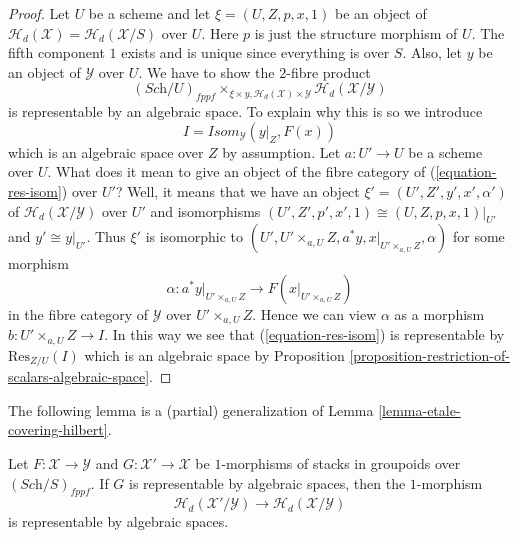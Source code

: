 \begin{proof}
Let $U$ be a scheme and let $\xi = (U, Z, p, x, 1)$ be an object of
$\mathcal{H}_d(\mathcal{X}) = \mathcal{H}_d(\mathcal{X}/S)$ over $U$.
Here $p$ is just the structure morphism of $U$.
The fifth component $1$ exists and is unique
since everything is over $S$.
Also, let $y$ be an object of $\mathcal{Y}$ over $U$.
We have to show the $2$-fibre product
\begin{equation}
\label{equation-res-isom}
(\textit{Sch}/U)_{fppf}
\times_{\xi \times y, \mathcal{H}_d(\mathcal{X}) \times \mathcal{Y}}
\mathcal{H}_d(\mathcal{X}/\mathcal{Y})
\end{equation}
is representable by an algebraic space. To explain why this is so
we introduce
$$
I = \mathit{Isom}_{\mathcal{Y}}(y|_Z, F(x))
$$
which is an algebraic space over $Z$ by assumption. Let $a : U' \to U$
be a scheme over $U$. What does it mean to give an object of the fibre
category of (\ref{equation-res-isom}) over $U'$? Well, it means that we
have an object $\xi' = (U', Z', y', x', \alpha')$ of
$\mathcal{H}_d(\mathcal{X}/\mathcal{Y})$ over $U'$ and isomorphisms
$(U', Z', p', x', 1) \cong (U, Z, p, x, 1)|_{U'}$ and
$y' \cong y|_{U'}$. Thus $\xi'$ is isomorphic to
$(U', U' \times_{a, U} Z, a^*y, x|_{U' \times_{a, U} Z}, \alpha)$
for some morphism
$$
\alpha :
a^*y|_{U' \times_{a, U} Z}
\longrightarrow
F(x|_{U' \times_{a, U} Z})
$$
in the fibre category of $\mathcal{Y}$ over $U' \times_{a, U} Z$. Hence
we can view $\alpha$ as a morphism $b : U' \times_{a, U} Z \to I$.
In this way we see that (\ref{equation-res-isom})
is representable by $\text{Res}_{Z/U}(I)$ which is an algebraic space by
Proposition \ref{proposition-restriction-of-scalars-algebraic-space}.
\end{proof}

\noindent
The following lemma is a (partial) generalization of
Lemma \ref{lemma-etale-covering-hilbert}.

\begin{lemma}
\label{lemma-representable-on-top}
Let $F : \mathcal{X} \to \mathcal{Y}$ and $G : \mathcal{X}' \to \mathcal{X}$
be $1$-morphisms of stacks in groupoids over $(\textit{Sch}/S)_{fppf}$.
If $G$ is representable by algebraic spaces, then the $1$-morphism
$$
\mathcal{H}_d(\mathcal{X}'/\mathcal{Y})
\longrightarrow
\mathcal{H}_d(\mathcal{X}/\mathcal{Y})
$$
is representable by algebraic spaces.
\end{lemma}

